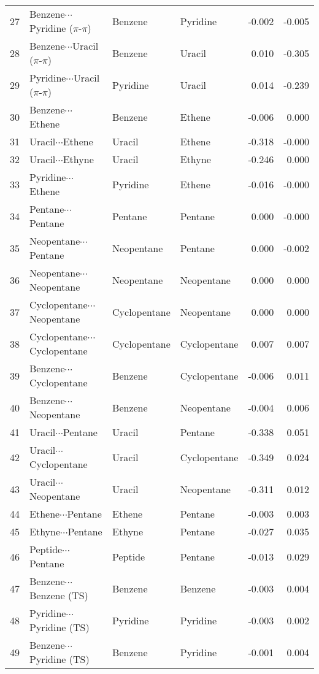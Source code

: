 \begin{longtable}{llllrr}
27 & Benzene$\cdots$Pyridine ($\pi$-$\pi$) & Benzene & Pyridine & -0.002 & -0.005 \\
28 & Benzene$\cdots$Uracil ($\pi$-$\pi$) & Benzene & Uracil & 0.010 & -0.305 \\
29 & Pyridine$\cdots$Uracil ($\pi$-$\pi$) & Pyridine & Uracil & 0.014 & -0.239 \\
30 & Benzene$\cdots$Ethene & Benzene & Ethene & -0.006 & 0.000 \\
31 & Uracil$\cdots$Ethene & Uracil & Ethene & -0.318 & -0.000 \\
32 & Uracil$\cdots$Ethyne & Uracil & Ethyne & -0.246 & 0.000 \\
33 & Pyridine$\cdots$Ethene & Pyridine & Ethene & -0.016 & -0.000 \\
34 & Pentane$\cdots$Pentane & Pentane & Pentane & 0.000 & -0.000 \\
35 & Neopentane$\cdots$Pentane & Neopentane & Pentane & 0.000 & -0.002 \\
36 & Neopentane$\cdots$Neopentane & Neopentane & Neopentane & 0.000 & 0.000 \\
37 & Cyclopentane$\cdots$Neopentane & Cyclopentane & Neopentane & 0.000 & 0.000 \\
38 & Cyclopentane$\cdots$Cyclopentane & Cyclopentane & Cyclopentane & 0.007 & 0.007 \\
39 & Benzene$\cdots$Cyclopentane & Benzene & Cyclopentane & -0.006 & 0.011 \\
40 & Benzene$\cdots$Neopentane & Benzene & Neopentane & -0.004 & 0.006 \\
41 & Uracil$\cdots$Pentane & Uracil & Pentane & -0.338 & 0.051 \\
42 & Uracil$\cdots$Cyclopentane & Uracil & Cyclopentane & -0.349 & 0.024 \\
43 & Uracil$\cdots$Neopentane & Uracil & Neopentane & -0.311 & 0.012 \\
44 & Ethene$\cdots$Pentane & Ethene & Pentane & -0.003 & 0.003 \\
45 & Ethyne$\cdots$Pentane & Ethyne & Pentane & -0.027 & 0.035 \\
46 & Peptide$\cdots$Pentane & Peptide & Pentane & -0.013 & 0.029 \\
47 & Benzene$\cdots$Benzene (TS) & Benzene & Benzene & -0.003 & 0.004 \\
48 & Pyridine$\cdots$Pyridine (TS) & Pyridine & Pyridine & -0.003 & 0.002 \\
49 & Benzene$\cdots$Pyridine (TS) & Benzene & Pyridine & -0.001 & 0.004 \\

\end{longtable}
